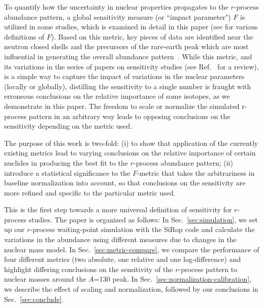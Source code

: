\documentclass[aps,prc,reprint,showpacs,floatfix,nofootinbib]{revtex4-1}
\begin{document}
To quantify how the uncertainty in nuclear properties propagates to the $r$-process abundance pattern, a global sensitivity measure
(or ``impact parameter") $F$ is utilized in some studies, which is examined in detail in this paper (see \citep{PhysRevC.92.035807,2012EPJA...48..184B,2012PhRvC..86c5803M} for various definitions of $F$). Based on this metric, key pieces of data are identified near the neutron closed shells and the precursors of the rare-earth peak which are most influential in generating the overall abundance pattern~\cite{2014EPJWC..6607024S}. While this metric, and its variations in the series of papers on sensitivity studies (see Ref.~\cite{Mumpower201686} for a review), is a simple way to capture the impact of variations in the nuclear parameters (locally or globally), distilling the sensitivity to a single number is fraught with erroneous conclusions on the relative importance of some isotopes, as we demonstrate in this paper. The freedom to scale or normalize the simulated r-process pattern in an arbitrary way leads to opposing conclusions on the sensitivity depending on the metric used. 

The purpose of this work is two-fold: (i) to show that application of the currently existing metrics lead to varying conclusions on the relative importance of certain nuclides in producing the best fit to the $r$-process abundance pattern; (ii) introduce a statistical significance to the $F$-metric that takes the arbitrariness in baseline normalization into account, so that conclusions on the sensitivity are more refined and specific to the particular metric used. 

This is the first step towards a more universal definition of sensitivity for $r$-process studies. The paper is organized as follows: In Sec.~\ref{sec:simulation}, we set up our $r$-process waiting-point simulation with the SiRop code and calculate the variations in the abundance using different measures due to changes in the nuclear mass model. In Sec.~\ref{sec:metric-compare}, we compare the performance of four different metrics (two absolute, one relative and one log-difference) and highlight differing conclusions on the sensitivity of the $r$-process pattern to nuclear masses around the $A$=130 peak. In Sec.~\ref{sec:normalization-calibration}, we 
describe the effect of scaling and normalization, followed by our conclusions in Sec.~\ref{sec:conclude}.
\end{document}
